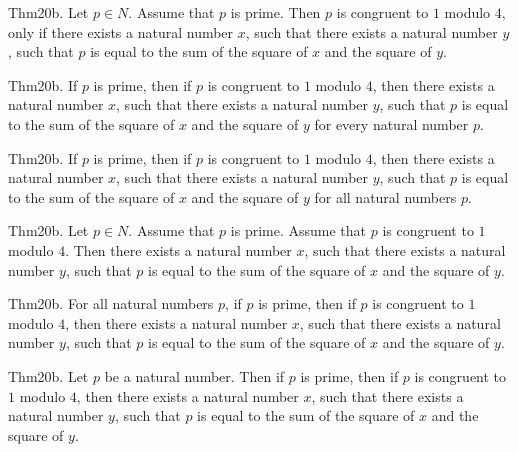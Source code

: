 \documentclass{article}
\begin{document}
Thm20b. Let $p \in N$. Assume that $p$ is prime. Then $p$ is congruent to $1$ modulo $4$, only if there exists a natural number $x$, such that there exists a natural number $y$, such that $p$ is equal to the sum of the square of $x$ and the square of $y$.

Thm20b. If $p$ is prime, then if $p$ is congruent to $1$ modulo $4$, then there exists a natural number $x$, such that there exists a natural number $y$, such that $p$ is equal to the sum of the square of $x$ and the square of $y$ for every natural number $p$.

Thm20b. If $p$ is prime, then if $p$ is congruent to $1$ modulo $4$, then there exists a natural number $x$, such that there exists a natural number $y$, such that $p$ is equal to the sum of the square of $x$ and the square of $y$ for all natural numbers $p$.

Thm20b. Let $p \in N$. Assume that $p$ is prime. Assume that $p$ is congruent to $1$ modulo $4$. Then there exists a natural number $x$, such that there exists a natural number $y$, such that $p$ is equal to the sum of the square of $x$ and the square of $y$.

Thm20b. For all natural numbers $p$, if $p$ is prime, then if $p$ is congruent to $1$ modulo $4$, then there exists a natural number $x$, such that there exists a natural number $y$, such that $p$ is equal to the sum of the square of $x$ and the square of $y$.

Thm20b. Let $p$ be a natural number. Then if $p$ is prime, then if $p$ is congruent to $1$ modulo $4$, then there exists a natural number $x$, such that there exists a natural number $y$, such that $p$ is equal to the sum of the square of $x$ and the square of $y$.
\end{document}
